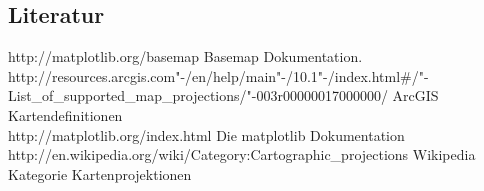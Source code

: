 \subsection*{Literatur}

http://matplotlib.org/basemap
Basemap Dokumentation.\\
http://resources.arcgis.com"-/en/help/main"-/10.1"-/index.html\#/"-List\_of\_supported\_map\_projections/"-003r00000017000000/ ArcGIS Kartendefinitionen\\
http://matplotlib.org/index.html Die matplotlib Dokumentation\\
http://en.wikipedia.org/wiki/Category:Cartographic\_projections Wikipedia Kategorie Kartenprojektionen
